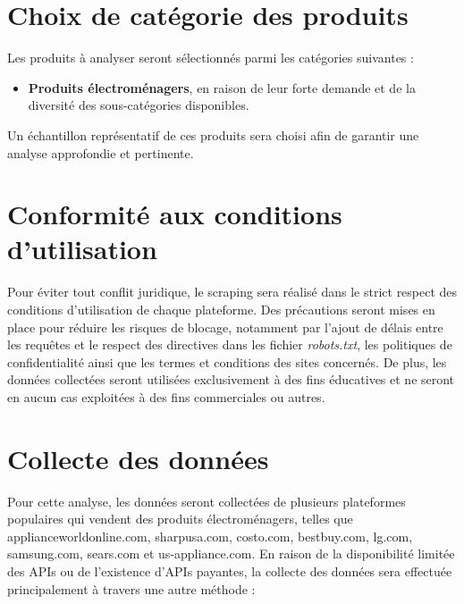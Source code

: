\documentclass[a4paper, 12pt, oneside]{report}
\begin{document}
\section{Choix de catégorie des produits}
Les produits à analyser seront sélectionnés parmi les catégories suivantes :

\begin{itemize}
    \item \textbf{Produits électroménagers}, en raison de leur forte demande et de la diversité des sous-catégories disponibles.
\end{itemize}

Un échantillon représentatif de ces produits sera choisi afin de garantir une analyse approfondie et pertinente.

\section{Conformité aux conditions d'utilisation}
Pour éviter tout conflit juridique, le scraping sera réalisé dans le strict respect des conditions d’utilisation de chaque plateforme. Des précautions seront mises en place pour réduire les risques de blocage, notamment par l’ajout de délais entre les requêtes et le respect des directives dans les fichier \textit{robots.txt}, les politiques de confidentialité ainsi que les termes et conditions des sites concernés.
De plus, les données collectées seront utilisées exclusivement à des fins éducatives et ne seront en aucun cas exploitées à des fins commerciales ou autres.


\section{Collecte des données}
Pour cette analyse, les données seront collectées de plusieurs plateformes populaires qui vendent des produits électroménagers, telles que applianceworldonline.com, sharpusa.com, costo.com, bestbuy.com, lg.com, samsung.com, sears.com et us-appliance.com. En raison de la disponibilité limitée des APIs ou de l'existence d'APIs payantes, la collecte des données sera effectuée principalement à travers une autre méthode :
\end{document}
